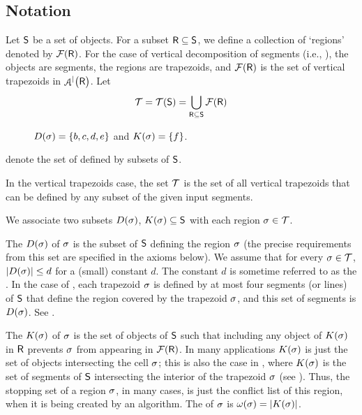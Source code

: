 \let\MultiX\undefined



\subsection{Notation} %
Let $\mathsf{S}$ be a set of objects.  For a subset
$\mathsf{R} \subseteq \mathsf{S}$, we define a collection of `regions'
denoted by $\RegionsSet{\Sample}$.  For the case of vertical
decomposition of segments (i.e., ), the objects are
segments, the regions are trapezoids, and $\RegionsSet{\Sample}$ is
the set of vertical trapezoids in $\ArrVD{\bigl.\Sample}$.  Let
\begin{equation*}
    \AllRegions = \AllRegions\pth{\ObjSet} = \bigcup_{\Sample
       \subseteq \ObjSet} \RegionsSet{\Sample}
\end{equation*}
\begin{figure}[t]
    \centering
    \caption{$\DefSet{\Trap}= \{b,c, d,e\}$ and $\KillSet{\Trap} = \{ f\}$.}
\end{figure}

denote the set of  defined by subsets of $\mathsf{S}$.


In the vertical trapezoids case, the set $\mathcal{T}$ is the set of
all vertical trapezoids that can be defined by any subset of the given
input segments.


We associate two subsets $\DefSet{\Trap}$,
$\KillSet{\Trap} \subseteq \ObjSet$ with each region
$\sigma \in \mathcal{T}$.



The  $\DefSet{ \Trap }$ of $\sigma$
is the subset of $\mathsf{S}$ defining the region $\sigma$ (the precise
requirements from this set are specified in the axioms below).  We
assume that for every $\sigma \in \mathcal{T}$,
$\cardin{\DefSet{\Trap}} \leq d$ for a (small) constant $d$. The
constant $d$ is sometime referred to as the .  In the case of
, each trapezoid $\sigma$ is defined by at most four
segments (or lines) of $\mathsf{S}$ that define the region covered by the
trapezoid $\sigma$, and this set of segments is $\DefSet{\Trap}$.  See
.


The  $\KillSet{ \Trap }$ of $\sigma$ is the set of
objects of $\mathsf{S}$ such that including any object of $\KillSet{
   \Trap }$ in $\mathsf{R}$ prevents $\sigma$ from appearing in
$\RegionsSet{\Sample }$.  In many applications $\KillSet{ \Trap }$ is
just the set of objects intersecting the cell $\sigma$; this is also
the case in , where $\KillSet{\Trap}$ is the set of
segments of $\mathsf{S}$ intersecting the interior of the trapezoid
$\sigma$ (see ).  Thus, the stopping set of a
region $\sigma$, in many cases, is just the conflict list of this
region, when it is being created by an \RIC algorithm.  The
 of $\sigma$ is $\WeightX{\Trap} =
\cardin{\KillSet{\Trap}}$.

